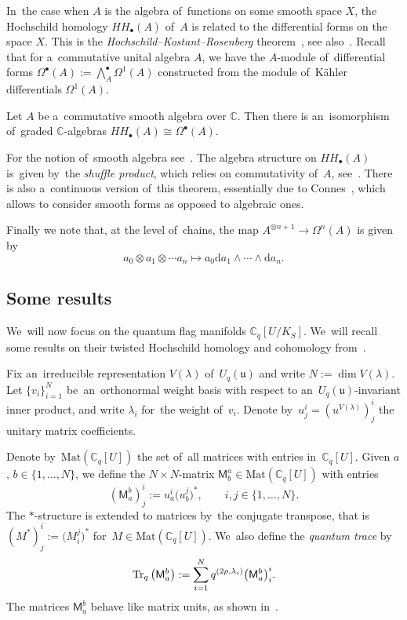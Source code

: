 \documentclass[pdftex]{sigma}
\numberwithin{equation}{section}
\newcommand{\Uqu}{U_q(\mathfrak{u})}
\newcommand{\CqU}{\mathbb{C}_q[U]}
\newcommand{\Cqflag}{\mathbb{C}_q[U / K_S]}
\newcommand{\diff}{\mathrm{d}}
\newcommand{\bbC}{\mathbb{C}}
\newcommand{\matuni}{\mathsf{M}}
\begin{document}
In~the case when $A$ is the algebra of~functions on some smooth space $X$, the Hoch\-schild homo\-logy $HH_\bullet(A)$ of~$A$ is related to the differential forms on the space $X$.
This is the \emph{Hoch\-schild--Kostant--Rosenberg} theorem~\cite{hkr}, see also~\cite[Theorem~3.4.4]{loday}.
Recall that for a~commutative unital algebra $A$, we have the $A$-module of~differential forms $\Omega^\bullet(A) := \bigwedge^\bullet_A \Omega^1(A)$ constructed from the module of~K\"ahler differentials $\Omega^1(A)$.

\begin{theorem*}
Let $A$ be a~commutative smooth algebra over $\bbC$.
Then there is an~isomorphism of~graded $\mathbb{C}$-algebras $HH_\bullet(A) \cong \Omega^\bullet(A)$.
\end{theorem*}

For the notion of~smooth algebra see~\cite[Section~3.4.1]{loday}.
The algebra structure on $HH_\bullet(A)$ is~given by~the \emph{shuffle product}, which relies on commutativity of~$A$, see~\cite[Section~4.2]{loday}.
There is also a~continuous version of~this theorem, essentially due to Connes~\cite{connes}, which allows to consider smooth forms as opposed to algebraic ones.

Finally we note that, at the level of~chains, the map $A^{\otimes n + 1} \to \Omega^n(A)$ is given by
\[
a_0 \otimes a_1 \otimes \cdots a_n \mapsto a_0 \diff a_1 \wedge \cdots \wedge \diff a_n.
\]

\subsection{Some results}

We~will now focus on the quantum flag manifolds $\Cqflag$.
We~will recall some results on their twisted Hoch\-schild homology and cohomology from~\cite{twist-hoch}.

Fix an~irreducible representation $V(\lambda)$ of~$\Uqu$ and write $N := \dim V(\lambda)$.
Let $\{v_i\}_{i = 1}^N$ be~an~ort\-ho\-normal weight basis with respect to an~$\Uqu$-invariant inner product, and write $\lambda_i$ for~the weight of~$v_i$.
Denote by~$u^i_j = (u^{V(\lambda)})^i_j$ the unitary matrix coefficients.

Denote by~$\mathrm{Mat}(\CqU)$ the set of~all matrices with entries in~$\CqU$.
Given $a$, $b \in \{ 1, \dots, N \}$, we define the $N \times N$-matrix $\matuni^a_b \in \mathrm{Mat}(\CqU)$ with entries
\[
(\matuni^b_a)^i_j := u^i_a \big(u^j_b\big)^*, \qquad
i, j \in \{ 1, \dots, N \}.
\]
The $*$-structure is extended to matrices by~the conjugate transpose, that is $(M^*)^i_j := \big(M^j_i\big)^*$ for~$M \in \mathrm{Mat}(\CqU)$.
We~also define the \emph{quantum trace} by
\[
\mathop{\rm Tr}\nolimits_q\big(\matuni^b_a\big) := \sum_{i = 1}^N q^{(2 \rho, \lambda_i)} \big(\matuni^b_a\big)^i_i.
\]
The matrices $\matuni^b_a$ behave like matrix units, as shown in~\cite[Proposition~3.3]{twist-hoch}.
\end{document}
